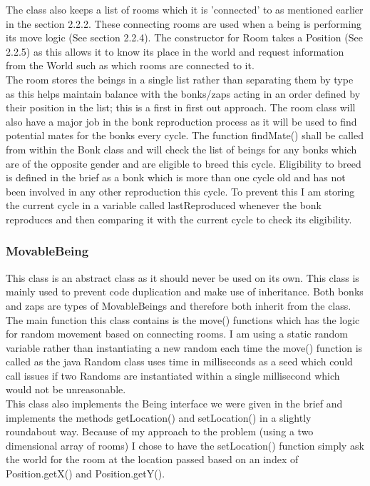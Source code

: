 \documentclass[12pt]{article}
\begin{document}
The class also keeps a list of rooms which it is 'connected' to as mentioned earlier in the section 2.2.2. These connecting rooms are used when a being is performing its move logic (See section 2.2.4). The constructor for Room takes a Position (See 2.2.5) as this allows it to know its place in the world and request information from the World such as which rooms are connected to it.\\

The room stores the beings in a single list rather than separating them by type as this helps maintain balance with the bonks/zaps acting in an order defined by their position in the list; this is a first in first out approach. The room class will also have a major job in the bonk reproduction process as it will be used to find potential mates for the bonks every cycle. The function findMate() shall be called from within the Bonk class and will check the list of beings for any bonks which are of the opposite gender and are eligible to breed this cycle. Eligibility to breed is defined in the brief as a bonk which is more than one cycle old and has not been involved in any other reproduction this cycle. To prevent this I am storing the current cycle in a variable called lastReproduced whenever the bonk reproduces and then comparing it with the current cycle to check its eligibility.  

\subsubsection{MovableBeing}
This class is an abstract class as it should never be used on its own. This class is mainly used to prevent code duplication and make use of inheritance. Both bonks and zaps are types of MovableBeings and therefore both inherit from the class. The main function this class contains is the move() functions which has the logic for random movement based on connecting rooms. I am using a static random variable rather than instantiating a new random each time the move() function is called as the java Random class uses time in milliseconds as a seed which could call issues if two Randoms are instantiated within a single millisecond which would not be unreasonable. \\

This class also implements the Being interface we were given in the brief and implements the methods getLocation() and setLocation() in a slightly roundabout way. Because of my approach to the problem (using a two dimensional array of rooms) I chose to have the setLocation() function simply ask the world for the room at the location passed based on an index of Position.getX() and Position.getY().\\
\end{document}
